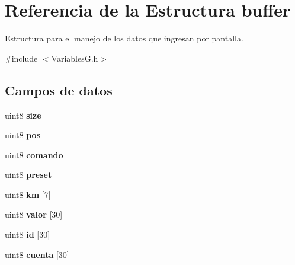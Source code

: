 \hypertarget{structbuffer}{}\section{Referencia de la Estructura buffer}
\label{structbuffer}


Estructura para el manejo de los datos que ingresan por pantalla.  




{\ttfamily \#include $<$Variables\+G.\+h$>$}

\subsection*{Campos de datos}
\begin{DoxyCompactItemize}
\item 
\mbox{\label{structbuffer_abf7f47b9039221e81ecb5eac8f3b090d}} 
uint8 {\bfseries size}
\item 
\mbox{\label{structbuffer_a55f54162334126543740c7f46b68e8ef}} 
uint8 {\bfseries pos}
\item 
\mbox{\label{structbuffer_af74dcab50285c6626969c06412e76e53}} 
uint8 {\bfseries comando}
\item 
\mbox{\label{structbuffer_ad55cfc60d0e5fc2b1b270604303f7183}} 
uint8 {\bfseries preset}
\item 
\mbox{\label{structbuffer_af35812f0b436a6bd305952f2c086f18d}} 
uint8 {\bfseries km} \mbox{[}7\mbox{]}
\item 
\mbox{\label{structbuffer_ae7872cd2130ae3a3b7b420c0d473ad8f}} 
uint8 {\bfseries valor} \mbox{[}30\mbox{]}
\item 
\mbox{\label{structbuffer_a531cb7e6535303f2f6250338b333d8e0}} 
uint8 {\bfseries id} \mbox{[}30\mbox{]}
\item 
\mbox{\label{structbuffer_ad3a80da94e063f40c8332b82be7e6370}} 
uint8 {\bfseries cuenta} \mbox{[}30\mbox{]}
\item 
\mbox{\label{structbuffer_a6af7af8c6b96b6c6e985b11fddfdd3f1}} 

\end{DoxyCompactItemize}

